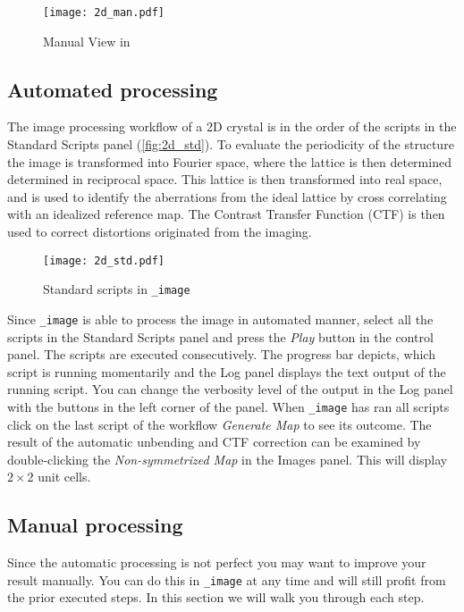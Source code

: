 	\begin{figure}[H]
		\centering
		\texttt{[image: 2d\_man.pdf]}
		\caption{Manual View in {\twodx}}
		\label{fig:2d_man}
	\end{figure}



\subsection{Automated processing}

The image processing workflow of a 2D crystal is in the order of the scripts in the Standard Scripts panel (\autoref{fig:2d_std}). To evaluate the periodicity of the structure the image is transformed into Fourier space, where the lattice is then determined determined in reciprocal space. This lattice is then transformed into real space, and is used to identify the aberrations from the ideal lattice by cross correlating with an idealized reference map. The Contrast Transfer Function (CTF) is then used to correct distortions originated from the imaging.
	
	\begin{figure}[H]
		\centering
		\texttt{[image: 2d\_std.pdf]}
		\caption{Standard scripts in {\twodx}\texttt{\_image}}
		\label{fig:2d_std}
	\end{figure}
	
Since {\twodx}\texttt{\_image} is able to process the image in automated manner, select all the scripts in the Standard Scripts panel and press the \textit{Play} button in the control panel.
The scripts are executed consecutively. The progress bar depicts, which script is running momentarily and the Log panel displays the text output of the running script. You can change the verbosity level of the output in the Log panel with the buttons in the left corner of the panel.
When {\twodx}\texttt{\_image} has ran all scripts click on the last script of the workflow \textit{Generate Map} to see its outcome. The result of the automatic unbending and CTF correction can be examined by double-clicking the \textit{Non-symmetrized Map} in the Images panel. This will display $2 \times 2$ unit cells.


\subsection{Manual processing}
Since the automatic processing is not perfect you may want to improve your result manually. You can do this in {\twodx}\texttt{\_image} at any time and will still profit from the prior executed steps.
In this section we will walk you through each step. 

